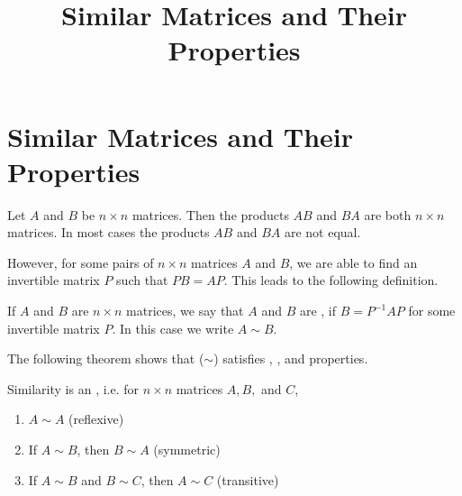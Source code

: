 \documentclass{ximera}
\title{Similar Matrices and Their Properties} \license{CC BY-NC-SA 4.0}
\begin{document}
\begin{abstract}
\end{abstract}
\maketitle

\section*{Similar Matrices and Their Properties}

Let $A$ and $B$ be $n \times n$ matrices.  Then the products $AB$ and $BA$ are both $n \times n$ matrices.  In most cases the products $AB$ and $BA$ are not equal.

However, for some pairs of $n \times n$ matrices $A$ and $B$, we are able to find an invertible matrix $P$ such that $PB = AP$.  This leads to the following definition.

\begin{definition}\label{def:similar}
If $A$ and $B$ are $n \times n$ matrices, we say that $A$ and $B$ are , if $B = P^{-1}AP$ for some invertible matrix $P$.  In this case we write $A \sim B$.
\end{definition}



 
The following theorem shows that  ($\sim$) satisfies , , and  properties.  %

\begin{theorem}\label{th:similarityequivalence}
Similarity is an , i.e. for $n \times n$ matrices $A,B,$ and $C$,
\begin{enumerate}
\item\label{item:reflexive} $A \sim A$ (reflexive)
\item\label{item:symmetric} If $A \sim B$, then $B \sim A$ (symmetric)
\item\label{item:transitive} If $A \sim B$ and $B \sim C$, then $A \sim C$ (transitive)
\end{enumerate}
\end{theorem}
\end{document}

